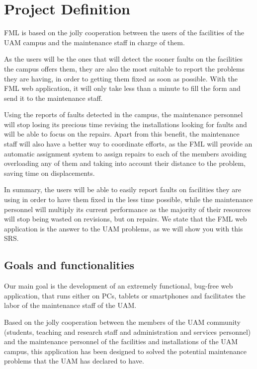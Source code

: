 \documentclass{report}
\begin{document}
\chapter{Project Definition}
\label{chapProjectDefinition}

FML is based on the jolly cooperation between the users of the facilities of the UAM campus and the maintenance staff in charge of them.

As the users will be the ones that will detect the sooner faults on the facilities the campus offers them, they are also the most suitable to report the problems they are having, in order to getting them fixed as soon as possible. With the FML web application, it will only take less than a minute to fill the form and send it to the maintenance staff.

Using the reports of faults detected in the campus, the maintenance personnel will stop losing its precious time revising the installations looking for faults and will be able to focus on the repairs. Apart from this benefit, the maintenance staff will also have a better way to coordinate efforts, as the FML will provide an automatic assignment system to assign repairs to each of the members avoiding overloading any of them and taking into account their distance to the problem, saving time on displacements.

In summary, the users will be able to easily report faults on facilities they are using in order to have them fixed in the less time possible, while the maintenance personnel will multiply its current performance as the majority of their resources will stop being wasted on revisions, but on repairs. We state that the FML web application is the answer to the UAM problems, as we will show you with this SRS.


\section{Goals and functionalities}

Our main goal is the development of an extremely functional, bug-free web application, that runs either on PCs, tablets or smartphones and facilitates the labor of the maintenance staff of the UAM.

Based on the jolly cooperation between the members of the UAM community (students, teaching and research staff and administration and services personnel) and the maintenance personnel of the facilities and installations of the UAM campus, this application has been designed to solved the potential maintenance problems that the UAM has declared to have.
\end{document}
